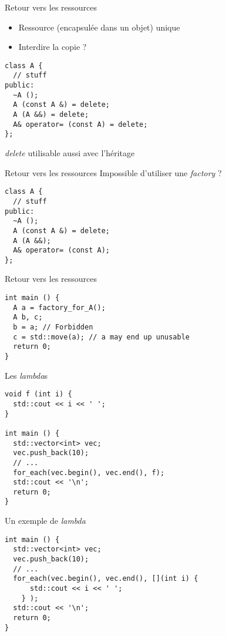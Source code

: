 \begin{frame}[fragile]{Retour vers les ressources}
  \begin{itemize}
  \item Ressource (encapsulée dans un objet) \og{}unique\fg{}
  \item Interdire la copie ?
  \end{itemize}

  \begin{lstlisting}
class A {
  // stuff
public:
  ~A ();
  A (const A &) = delete;
  A (A &&) = delete;
  A& operator= (const A) = delete;
};
  \end{lstlisting}

  \textit{delete} utilisable aussi avec l'héritage
\end{frame}

\begin{frame}[fragile]{Retour vers les ressources}
  Impossible d'utiliser une \textit{factory} ?
  
  \begin{lstlisting}
class A {
  // stuff
public:
  ~A ();
  A (const A &) = delete;
  A (A &&);
  A& operator= (const A);
};
  \end{lstlisting}
\end{frame}

\begin{frame}[fragile]{Retour vers les ressources}
  \begin{lstlisting}
int main () {
  A a = factory_for_A();
  A b, c;
  b = a; // Forbidden
  c = std::move(a); // a may end up unusable
  return 0;
}
  \end{lstlisting}
\end{frame}

\begin{frame}[fragile]{Les \textit{lambda}s}
  \begin{lstlisting}
void f (int i) {
  std::cout << i << ' ';
}

int main () {
  std::vector<int> vec;
  vec.push_back(10);
  // ...
  for_each(vec.begin(), vec.end(), f);
  std::cout << '\n';
  return 0;
}
  \end{lstlisting}
\end{frame}

\begin{frame}[fragile]{Un exemple de \textit{lambda}}
  \begin{lstlisting}
int main () {
  std::vector<int> vec;
  vec.push_back(10);
  // ...
  for_each(vec.begin(), vec.end(), [](int i) {
      std::cout << i << ' ';
    } );
  std::cout << '\n';
  return 0;
}
  \end{lstlisting}
\end{frame}

